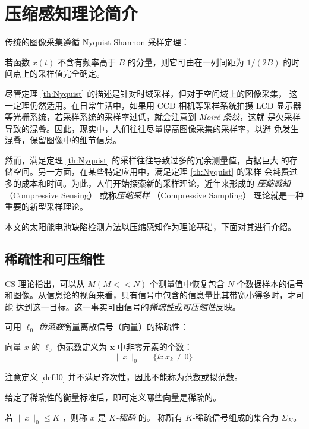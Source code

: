 \section{压缩感知理论简介}

传统的图像采集遵循 Nyquist-Shannon 采样定理：
\begin{theorem}[采样定理] \label{th:Nyquist}
若函数 $x(t)$ 不含有频率高于 $B$ 的分量，则它可由在一列间距为 $1/(2B)$
的时间点上的采样值完全确定。
\end{theorem}

尽管定理 \ref{th:Nyquist} 的描述是针对时域采样，但对于空间域上的图像采集，
这一定理仍然适用。在日常生活中，如果用 CCD 相机等采样系统拍摄 LCD 显示器
等光栅系统，若采样系统的采样率过低，就会注意到 \emph{Moir\'e 条纹}，这就
是欠采样导致的混叠。因此，现实中，人们往往尽量提高图像采集的采样率，以避
免发生混叠，保留图像中的细节信息。

然而，满足定理 \ref{th:Nyquist} 的采样往往导致过多的冗余测量值，占据巨大
的存储空间。另一方面，在某些特定应用中，满足定理 \ref{th:Nyquist} 的采样
会耗费过多的成本和时间。为此，人们开始探索新的采样理论，近年来形成的
\emph{压缩感知} （Compressive Sensing） 或称\emph{压缩采样}
（Compressive Sampling） 理论就是一种重要的新型采样理论。

本文的太阳能电池缺陷检测方法以压缩感知作为理论基础，下面对其进行介绍。

\subsection{稀疏性和可压缩性}

CS 理论指出，可以从 $M (M << N)$ 个测量值中恢复包含 $N$ 个数据样本的信号
和图像。从信息论的视角来看，只有信号中包含的信息量比其带宽小得多时，才可能
达到这一目标。这一事实可由信号的\emph{稀疏性}或\emph{可压缩性}反映。

可用 \emph{$\ell_0$ 伪范数}衡量离散信号（向量）的稀疏性：

\begin{definition} \label{def:l0} 向量 $x$ 的
$\ell_0$ 伪范数定义为 $\mathbf{x}$ 中非零元素的个数：
\begin{equation}
\|x\|_0 = |\{k:x_k \neq 0\}|
\end{equation}
\end{definition}
注意定义 \ref{def:l0} 并不满足齐次性，因此不能称为范数或拟范数。

给定了稀疏性的衡量标准后，即可定义哪些向量是稀疏的。
\begin{definition}[$K$-稀疏] \label{def:K-sparse} 若
$\|x\|_0 \leq K$ ，则称 $x$ 是 \emph{$K$-稀疏} 的。
称所有 $K$-稀疏信号组成的集合为 $\Sigma_K$。
\end{definition}

